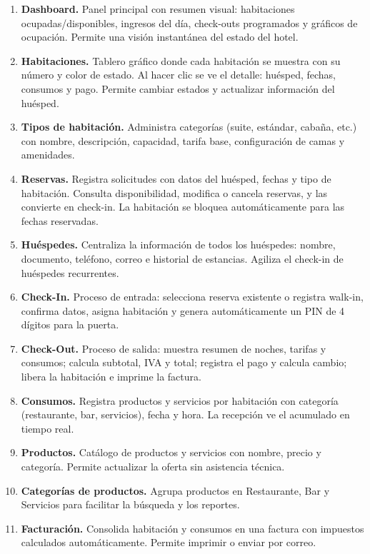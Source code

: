 \documentclass[12pt,a4paper]{article}
\begin{document}
\begin{enumerate}[leftmargin=*]
    \item \textbf{Dashboard.} Panel principal con resumen visual: habitaciones ocupadas/disponibles, ingresos del día, check-outs programados y gráficos de ocupación. Permite una visión instantánea del estado del hotel.
    \item \textbf{Habitaciones.} Tablero gráfico donde cada habitación se muestra con su número y color de estado. Al hacer clic se ve el detalle: huésped, fechas, consumos y pago. Permite cambiar estados y actualizar información del huésped.
    \item \textbf{Tipos de habitación.} Administra categorías (suite, estándar, cabaña, etc.) con nombre, descripción, capacidad, tarifa base, configuración de camas y amenidades.
    \item \textbf{Reservas.} Registra solicitudes con datos del huésped, fechas y tipo de habitación. Consulta disponibilidad, modifica o cancela reservas, y las convierte en check-in. La habitación se bloquea automáticamente para las fechas reservadas.
    \item \textbf{Huéspedes.} Centraliza la información de todos los huéspedes: nombre, documento, teléfono, correo e historial de estancias. Agiliza el check-in de huéspedes recurrentes.
    \item \textbf{Check-In.} Proceso de entrada: selecciona reserva existente o registra walk-in, confirma datos, asigna habitación y genera automáticamente un PIN de 4 dígitos para la puerta.
    \item \textbf{Check-Out.} Proceso de salida: muestra resumen de noches, tarifas y consumos; calcula subtotal, IVA y total; registra el pago y calcula cambio; libera la habitación e imprime la factura.
    \item \textbf{Consumos.} Registra productos y servicios por habitación con categoría (restaurante, bar, servicios), fecha y hora. La recepción ve el acumulado en tiempo real.
    \item \textbf{Productos.} Catálogo de productos y servicios con nombre, precio y categoría. Permite actualizar la oferta sin asistencia técnica.
    \item \textbf{Categorías de productos.} Agrupa productos en Restaurante, Bar y Servicios para facilitar la búsqueda y los reportes.
    \item \textbf{Facturación.} Consolida habitación y consumos en una factura con impuestos calculados automáticamente. Permite imprimir o enviar por correo.

\end{enumerate}
\end{document}

